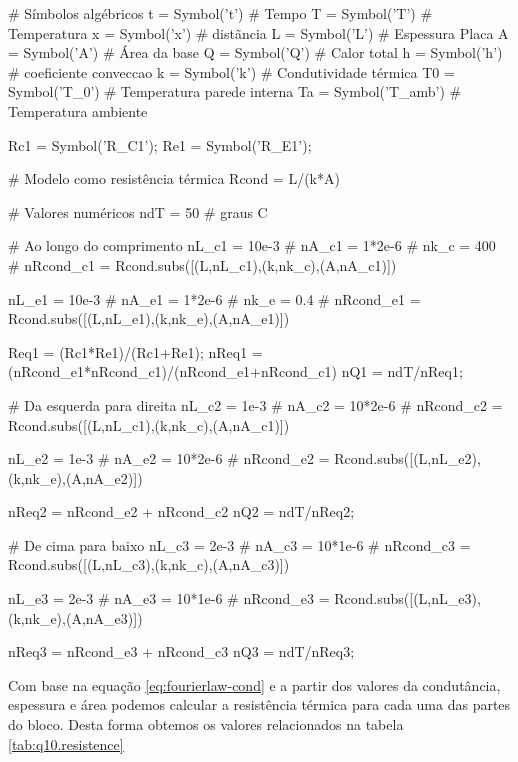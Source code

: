 \documentclass[a4paper,11pt]{article}
\begin{document}
\begin{sympycode}
# Símbolos algébricos
t = Symbol('t') # Tempo
T = Symbol('T') # Temperatura
x = Symbol('x') # distãncia
L = Symbol('L') # Espessura Placa
A = Symbol('A') # Área da base
Q = Symbol('Q') # Calor total
h = Symbol('h') # coeficiente conveccao
k = Symbol('k') # Condutividade térmica
T0 = Symbol('T_0') # Temperatura parede interna
Ta = Symbol('T_amb') # Temperatura ambiente

Rc1 = Symbol('R_C1');
Re1 = Symbol('R_E1');

# Modelo como resistência térmica
Rcond = L/(k*A)

# Valores numéricos
ndT = 50 # graus C

# Ao longo do comprimento
nL_c1 = 10e-3 #
nA_c1 = 1*2e-6 #
nk_c = 400 #
nRcond_c1 = Rcond.subs([(L,nL_c1),(k,nk_c),(A,nA_c1)])

nL_e1 = 10e-3 #
nA_e1 = 1*2e-6 #
nk_e = 0.4 #
nRcond_e1 = Rcond.subs([(L,nL_e1),(k,nk_e),(A,nA_e1)])

Req1 = (Rc1*Re1)/(Rc1+Re1);
nReq1 = (nRcond_e1*nRcond_c1)/(nRcond_e1+nRcond_c1)
nQ1 = ndT/nReq1;

# Da esquerda para direita
nL_c2 = 1e-3 #
nA_c2 = 10*2e-6 #
nRcond_c2 = Rcond.subs([(L,nL_c1),(k,nk_c),(A,nA_c1)])

nL_e2 = 1e-3 #
nA_e2 = 10*2e-6 #
nRcond_e2 = Rcond.subs([(L,nL_e2),(k,nk_e),(A,nA_e2)])

nReq2 = nRcond_e2 + nRcond_c2
nQ2 = ndT/nReq2;

# De cima para baixo
nL_c3 = 2e-3 #
nA_c3 = 10*1e-6 #
nRcond_c3 = Rcond.subs([(L,nL_c3),(k,nk_c),(A,nA_c3)])

nL_e3 = 2e-3 #
nA_e3 = 10*1e-6 #
nRcond_e3 = Rcond.subs([(L,nL_e3),(k,nk_e),(A,nA_e3)])

nReq3 = nRcond_e3 + nRcond_c3
nQ3 = ndT/nReq3;
\end{sympycode}

Com base na equação \ref{eq:fourierlaw-cond} e a partir dos valores da condutância, espessura e área podemos calcular a resistência térmica para cada uma das partes do bloco. Desta forma obtemos os valores relacionados na tabela \ref{tab:q10.resistence}
\end{document}
